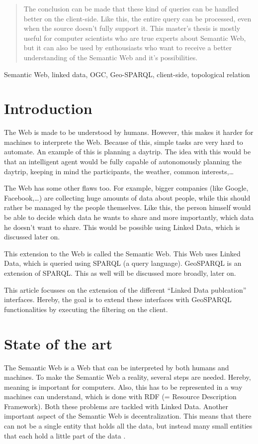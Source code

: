 \documentclass[twocolumn]{phdsymp} %
\begin{document}
\begin{abstract}
    The conclusion can be made that these kind of queries can be handled better on the client-side. Like this, the entire query can be processed, even when the source doesn't fully support it. This master's thesis is mostly useful for computer scientists who are true experts about Semantic Web, but it can also be used by enthousiasts who want to receive a better understanding of the Semantic Web and it's possibilities.
\end{abstract}

\begin{keywords}
    Semantic Web, linked data, OGC, Geo-SPARQL, client-side, topological relation
\end{keywords}

\section{Introduction}
The Web is made to be understood by humans. However, this makes it harder for machines to interprete the Web. Because of this, simple tasks are very hard to automate. An example of this is planning a daytrip. The idea with this would be that an intelligent agent would be fully capable of autonomously planning the daytrip, keeping in mind the participants, the weather, common interests,\dots

The Web has some other flaws too. For example, bigger companies (like Google, Facebook,\dots) are collecting huge amounts of data about people, while this should rather be managed by the people themselves. Like this, the person himself would be able to decide which data he wants to share and more importantly, which data he doesn't want to share. This would be possible using Linked Data, which is discussed later on.

This extension to the Web is called the Semantic Web. This Web uses Linked Data, which is queried using SPARQL (a query language). GeoSPARQL is an extension of SPARQL. This as well will be discussed more broadly, later on.

This article focusses on the extension of the different ``Linked Data publcation'' interfaces. Hereby, the goal is to extend these interfaces with GeoSPARQL functionalities by executing the filtering on the client.

\section{State of the art}
The Semantic Web is a Web that can be interpreted by both humans and machines. To make the Semantic Web a reality, several steps are needed. Hereby, meaning is important for computers. Also, this has to be represented in a way machines can understand, which is done with RDF (= Resource Description Framework). Both these problems are tackled with Linked Data. Another important aspect of the Semantic Web is decentralization. This means that there can not be a single entity that holds all the data, but instead many small entities that each hold a little part of the data \cite{berners2001semantic}. 
\end{document}
